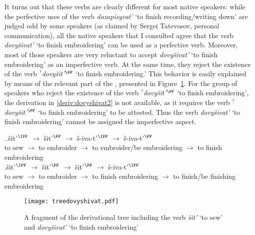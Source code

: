It turns out that these verbs are clearly different for most native speakers: while the perfective uses of the verb \textit{dozapisyvat'} `to finish recording/writing down' are judged odd by some speakers (as claimed by Sergei Tatevosov, personal communication), all the native speakers that I consulted agree that the verb \textit{dovy\v{s}ivat'} `to finish embroidering' can be used as a perfective verb. Moreover, most of those speakers are very reluctant to accept \textit{dovy\v{s}ivat'} `to finish embroidering' as an imperfective verb. At the same time, they reject the existence of the verb $^?$\textit{dovy\v{s}it'}$^\PF$ `to finish embroidering.' This behavior is easily explained by means of the relevant part of the , presented in Figure~\ref{tree:dovyshivat}. For the group of speakers who reject the existence of the verb $^?$\textit{dovy\v{s}it'}$^\PF$ `to finish embroidering', the derivation in \ref{deriv:dovyshivat2} is not available, as it requires the verb $^?$\textit{dovy\v{s}it'}$^\PF$ `to finish embroidering' to be attested. Thus the verb \textit{dovy\v{s}ivat'} `to finish embroidering' cannot be assigned the imperfective aspect.

\ex.\label{deriv:dovyshivat}\ag.\label{deriv:dovyshivat1}\v{s}it'$^\IPF$ $\rightarrow$ \v{s}it'$^\PF$ $\rightarrow$ \v{s}-iva-t'$^\IPF$ $\rightarrow$ \v{s}-iva-t'$^\PF$\\
{to sew} $\rightarrow$ {to embroider} $\rightarrow$ {to embroider/be embroidering} $\rightarrow$ {to finish embroidering}\\
\bg.\label{deriv:dovyshivat2}\v{s}it'$^\IPF$ $\rightarrow$ \v{s}it'$^\PF$ $\rightarrow$ \v{s}it'$^\PF$ $\rightarrow$ \v{s}-iva-t'$^\IPF$\\
{to sew} $\rightarrow$ {to embroider} $\rightarrow$ {to finish embroidering} $\rightarrow$ {to finish/be finishing embroidering}\\

\begin{figure}
\begin{center}
\texttt{[image: treedovyshivat.pdf]}
\caption{A fragment of the derivational tree including the verb \textit{\v{s}it'} `to sew' and \textit{dovy\v{s}ivat'} `to finish embroidering'\label{tree:dovyshivat}}
\end{center}
\end{figure}		


